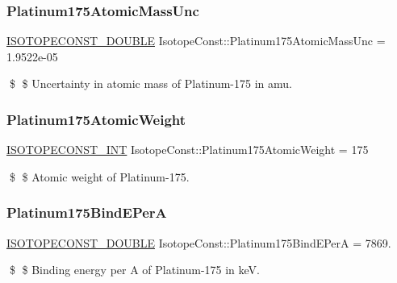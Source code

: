 \subsubsection{\texorpdfstring{Platinum175\+Atomic\+Mass\+Unc}{Platinum175AtomicMassUnc}}
{\footnotesize\ttfamily \mbox{\hyperlink{group___isotope_const-_macros_ga8f45a7272ce02c0b4c65c44636ed719a}{I\+S\+O\+T\+O\+P\+E\+C\+O\+N\+S\+T\+\_\+\+D\+O\+U\+B\+LE}} Isotope\+Const\+::\+Platinum175\+Atomic\+Mass\+Unc = 1.\+9522e-\/05}

\$ \$ Uncertainty in atomic mass of Platinum-\/175 in amu. \mbox{\label{group___isotope_const-_platinum-_pt175_ga21e1991a0e7128717ecff60009bc4b38}} 
\subsubsection{\texorpdfstring{Platinum175\+Atomic\+Weight}{Platinum175AtomicWeight}}
{\footnotesize\ttfamily \mbox{\hyperlink{group___isotope_const-_macros_ga5f18360b3e99483a35c32d789e62621c}{I\+S\+O\+T\+O\+P\+E\+C\+O\+N\+S\+T\+\_\+\+I\+NT}} Isotope\+Const\+::\+Platinum175\+Atomic\+Weight = 175}

\$ \$ Atomic weight of Platinum-\/175. \mbox{\label{group___isotope_const-_platinum-_pt175_gaf7a4fdd6d28d850669cf88a4a30219b7}} 
\subsubsection{\texorpdfstring{Platinum175\+Bind\+E\+PerA}{Platinum175BindEPerA}}
{\footnotesize\ttfamily \mbox{\hyperlink{group___isotope_const-_macros_ga8f45a7272ce02c0b4c65c44636ed719a}{I\+S\+O\+T\+O\+P\+E\+C\+O\+N\+S\+T\+\_\+\+D\+O\+U\+B\+LE}} Isotope\+Const\+::\+Platinum175\+Bind\+E\+PerA = 7869.}

\$ \$ Binding energy per A of Platinum-\/175 in keV. \mbox{\label{group___isotope_const-_platinum-_pt175_ga34e01f2fdbb7e4c5b63f6dfd0cc37c13}} 
